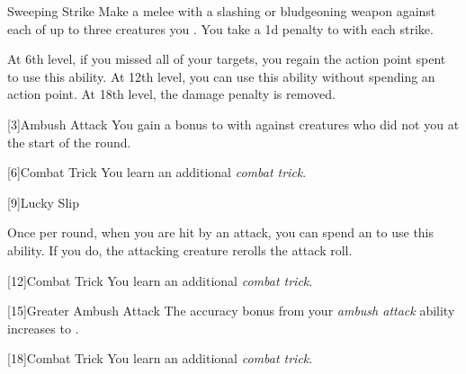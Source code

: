{            \begin{ability}{Sweeping Strike}
                Make a melee  with a slashing or bludgeoning weapon against each of up to three creatures you .
                You take a \minus1d penalty to  with each strike.

                At 6th level, if you missed all of your targets, you regain the action point spent to use this ability.
                At 12th level, you can use this ability without spending an action point.
                At 18th level, the damage penalty is removed.
            \end{ability}
        }

        [3]{Ambush Attack}
        You gain a  bonus to  with  against creatures who did not  you at the start of the round.

        [6]{Combat Trick}
        You learn an additional \textit{combat trick}.

        [9]{Lucky Slip}
        \begin{ability}
            Once per round, when you are hit by an attack, you can spend an  to use this ability.
            If you do, the attacking creature rerolls the attack roll.
        \end{ability}

        [12]{Combat Trick}
        You learn an additional \textit{combat trick}.

        [15]{Greater Ambush Attack}
        The accuracy bonus from your \textit{ambush attack} ability increases to .

        [18]{Combat Trick}
        You learn an additional \textit{combat trick}.
